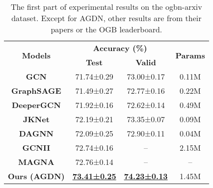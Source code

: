 \documentclass{article}
\begin{document}
\begin{table}[hbt]
\caption{The first part of experimental results on the ogbn-arxiv dataset. Except for AGDN, other results are from their papers or the OGB leaderboard.}
\begin{center}
\begin{tabular}[l]{c|cc|c}
\toprule[1pt]
\multirow{2}{*}{\textbf{Models}} & \multicolumn{2}{c|}{\textbf{Accuracy (\%)}} & \multirow{2}{*}{\textbf{Params}}\\
 & \textbf{Test} & \textbf{Valid} & \\
\midrule
\textbf{GCN}  & 71.74\scriptsize{±0.29} & 73.00\scriptsize{±0.17} & 0.11M \\ 
\textbf{GraphSAGE} & 71.49\scriptsize{±0.27} & 72.77\scriptsize{±0.16} & 0.22M \\
\textbf{DeeperGCN} & 71.92\scriptsize{±0.16} & 72.62\scriptsize{±0.14} & 0.49M \\ 
\textbf{JKNet} & 72.19\scriptsize{±0.21} & 73.35\scriptsize{±0.07} & 0.09M \\
\textbf{DAGNN} & 72.09\scriptsize{±0.25} & 72.90\scriptsize{±0.11} & 0.04M \\
\textbf{GCNII} & 72.74\scriptsize{±0.16} & – & 2.15M \\ 
\textbf{MAGNA} & 72.76\scriptsize{±0.14} & – & – \\
\textbf{Ours (AGDN)} & \underline{\textbf{73.41\scriptsize{±0.25}}} & \underline{\textbf{74.23\scriptsize{±0.13}}} & 1.45M \\ 
\bottomrule[1pt]

\end{tabular}
\end{center}
\label{tab: experiments on ogbn-arxiv}
\end{table}
\end{document}

